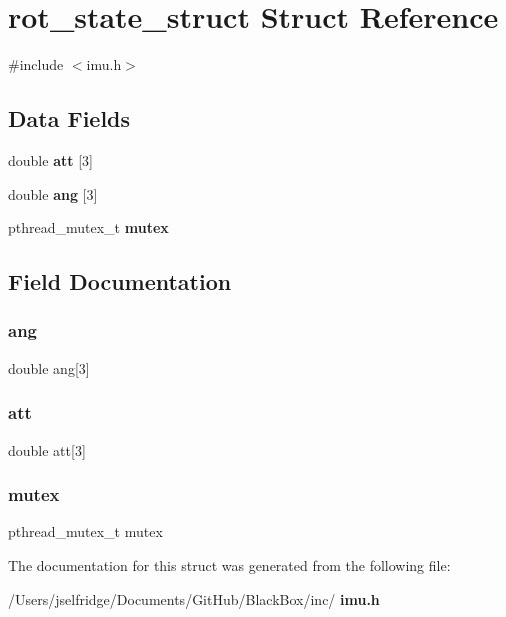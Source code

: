 \section{rot\+\_\+state\+\_\+struct Struct Reference}
\label{structrot__state__struct}


{\ttfamily \#include $<$imu.\+h$>$}

\subsection*{Data Fields}
\begin{DoxyCompactItemize}
\item 
double \textbf{ att} [3]
\item 
double \textbf{ ang} [3]
\item 
pthread\+\_\+mutex\+\_\+t \textbf{ mutex}
\end{DoxyCompactItemize}


\subsection{Field Documentation}
\mbox{\label{structrot__state__struct_a858297e59a52bb03260dd372cdd6261e}} 
\subsubsection{ang}
{\footnotesize\ttfamily double ang[3]}

\mbox{\label{structrot__state__struct_a925ba95caac7c7968afaf93709b6a4ab}} 
\subsubsection{att}
{\footnotesize\ttfamily double att[3]}

\mbox{\label{structrot__state__struct_a4acff8232e4aec9cd5c6dc200ac55ef3}} 
\subsubsection{mutex}
{\footnotesize\ttfamily pthread\+\_\+mutex\+\_\+t mutex}



The documentation for this struct was generated from the following file\+:\begin{DoxyCompactItemize}
\item 
/\+Users/jselfridge/\+Documents/\+Git\+Hub/\+Black\+Box/inc/\textbf{ imu.\+h}\end{DoxyCompactItemize}
